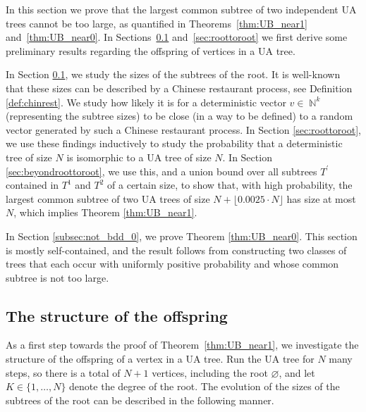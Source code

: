 \documentclass[11pt]{article}
\numberwithin{equation}{section}
\DeclareMathOperator{\N}{\mathbb{N}} %
\theoremstyle{definition}
\begin{document}
In this section we prove that the largest common subtree of two independent UA trees cannot be too large, as quantified in Theorems~\ref{thm:UB_near1} and~\ref{thm:UB_near0}. 
In Sections~\ref{sec:offspring distribution} and~\ref{sec:roottoroot} we first derive some preliminary results regarding the offspring of vertices in a UA tree. 

In Section \ref{sec:offspring distribution}, we study the sizes of the subtrees of the root. It is well-known that these sizes can be described by a Chinese restaurant process, see Definition \ref{def:chinrest}. We study how likely it is for a deterministic vector $v \in \N^k$ (representing the subtree sizes) to be close (in a way to be defined) to a random vector generated by such a Chinese restaurant process. In Section \ref{sec:roottoroot}, we use these findings inductively to study the probability that a deterministic tree of size $N$ is isomorphic to a UA tree of size $N$. In Section \ref{sec:beyondroottoroot}, we use this, and a union bound over all subtrees $T^\prime$ contained in $T^1$ and $T^2$ of a certain size, to show that, with high probability, the largest common subtree of two UA trees of size $N+ \lfloor 0.0025 \cdot N\rfloor$ has size at most $N$, which implies Theorem \ref{thm:UB_near1}.

In Section \ref{subsec:not_bdd_0}, we prove Theorem \ref{thm:UB_near0}. This section is mostly self-contained, and the result follows from constructing two classes of trees that each occur with uniformly positive probability and whose common subtree is not too large.


\subsection{The structure of the offspring} \label{sec:offspring distribution} %

\noindent As a first step towards the proof of Theorem~\ref{thm:UB_near1}, we investigate the structure of the offspring of a vertex in a UA tree. Run the UA tree for $N$ many steps, so there is a total of $N+1$ vertices, including the root $\varnothing$, and let $K\in \{1,\ldots,N\}$ denote the degree of the root.  The evolution of the sizes of the subtrees of the root can be described in the following manner. 
\end{document}
